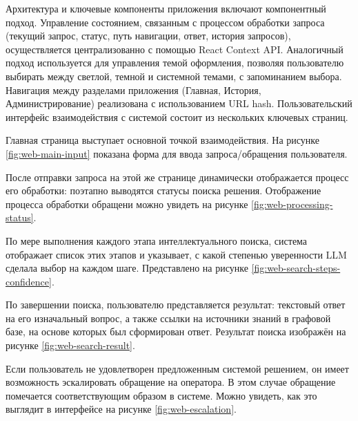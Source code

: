Архитектура и ключевые компоненты приложения включают компонентный подход. Управление состоянием, связанным с процессом обработки запроса (текущий запрос, статус, путь навигации, ответ, история запросов), осуществляется централизованно с помощью React Context API. Аналогичный подход используется для управления темой оформления, позволяя пользователю выбирать между светлой, темной и системной темами, с запоминанием выбора. Навигация между разделами приложения (Главная, История, Администрирование) реализована с использованием URL hash.
Пользовательский интерфейс взаимодействия с системой состоит из нескольких ключевых страниц.

Главная страница выступает основной точкой взаимодействия. На рисунке \ref{fig:web-main-input} показана форма для ввода запроса/обращения пользователя.


После отправки запроса на этой же странице динамически отображается процесс его обработки: поэтапно выводятся статусы поиска решения. Отображение процесса обработки обращени можно увидеть на рисунке \ref{fig:web-processing-status}.


По мере выполнения каждого этапа интеллектуального поиска, система отображает список этих этапов и указывает, с какой степенью уверенности LLM сделала выбор на каждом шаге. Представлено на рисунке \ref{fig:web-search-steps-confidence}.


По завершении поиска, пользователю представляется результат: текстовый ответ на его изначальный вопрос, а также ссылки на источники знаний в графовой базе, на основе которых был сформирован ответ. Результат поиска изображён на рисунке \ref{fig:web-search-result}.

  
Если пользователь не удовлетворен предложенным системой решением, он имеет возможность эскалировать обращение на оператора. В этом случае обращение помечается соответствующим образом в системе. Можно увидеть, как это выглядит в интерфейсе на рисунке \ref{fig:web-escalation}.

